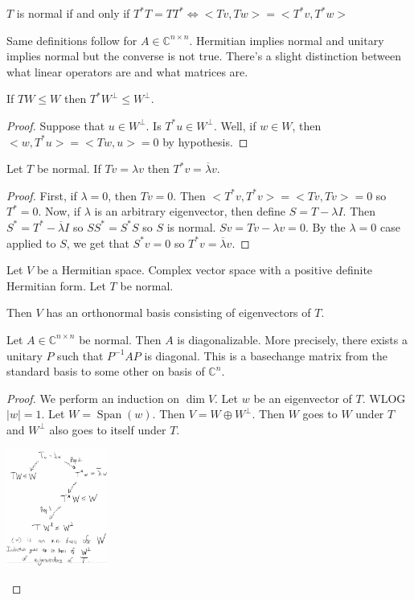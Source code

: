 \documentclass{article}
\newcommand{\C}{\mathbb{C}}
\DeclareMathOperator{\Span}{Span}
\begin{document}
\begin{definition}
$T$ is normal if and only if $T^*T=TT^*\iff <Tv,Tw>=<T^*v,T^*w>$
\end{definition}
Same definitions follow for $A\in \C^{n\times n}$. Hermitian implies normal and unitary implies normal but the converse is not true. There's a slight distinction between what linear operators are and what matrices are.
\begin{proposition}
If $TW\leq W$ then $T^*W^\perp\leq W^\perp$. 
\end{proposition}
\begin{proof}
Suppose that $u\in W^\perp$. Is $T^*u\in W^\perp$. Well, if $w\in W$, then $<w,T^*u>=<Tw,u>=0$ by hypothesis.
\end{proof}
\begin{proposition}
Let $T$ be normal. If $Tv=\lambda v$ then $T^*v=\overline{\lambda}v$.
\end{proposition}
\begin{proof}
First, if $\lambda=0$, then $Tv=0$. Then $<T^*v,T^*v>=<Tv,Tv>=0$ so $T^*=0$. Now, if $\lambda$ is an arbitrary eigenvector, then define $S=T-\lambda I$. Then $S^*=T^*-\overline{\lambda}I$ so $SS^*=S^*S$ so $S$ is normal. $Sv=Tv-\lambda v=0$. By the $\lambda=0$ case applied to $S$, we get that $S^*v=0$ so $T^*v=\overline{\lambda}v$.
\end{proof}
\begin{theorem}
Let $V$ be a Hermitian space. Complex vector space with a positive definite Hermitian form. Let $T$ be normal. 

Then $V$ has an orthonormal basis consisting of eigenvectors of $T$.
\end{theorem}
\begin{theorem}
Let $A\in \C^{n\times n}$ be normal. Then $A$ is diagonalizable. More precisely, there exists a unitary $P$ such that $P^{-1}AP$ is diagonal. This is a basechange matrix from the standard basis to some other on basis of $\C^n$.
\end{theorem}
\begin{proof}
We perform an induction on $\dim V$. Let $w$ be an eigenvector of $T$. WLOG $|w|=1$. Let $W=\Span(w).$ Then $V=W\oplus W^\perp$. Then $W$ goes to $W$ under $T$ and $W^\perp$ also goes to itself under $T$.
\begin{center}
        \includegraphics[width=0.25\textwidth]{Image 1122020.PNG}
    \end{center}
\end{proof}
\end{document}
